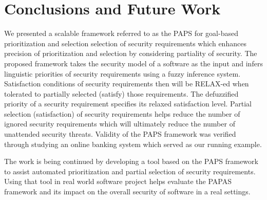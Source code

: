 \section{Conclusions and Future Work}
\label{conclusion}

We presented a scalable framework referred to as the PAPS for goal-based prioritization and selection selection of security requirements which enhances precision of prioritization and selection by considering partiality of security. The proposed framework takes the security model of a software as the input and infers linguistic priorities of security requirements using a fuzzy inference system. Satisfaction conditions of security requirements then will be RELAX-ed when tolerated to partially selected (satisfy) those requirements. The defuzzified priority of a security requirement specifies its relaxed satisfaction level. Partial selection (satisfaction) of security requirements helps reduce the number of ignored security requirements which will ultimately reduce the number of unattended security threats. Validity of the PAPS framework was verified through studying an online banking system which served as our running example.  

The work is being continued by developing a tool based on the PAPS framework to assist automated prioritization and partial selection of security requirements. Using that tool in real world software project helps evaluate the PAPAS framework and its impact on the overall security of software in a real settings.  %